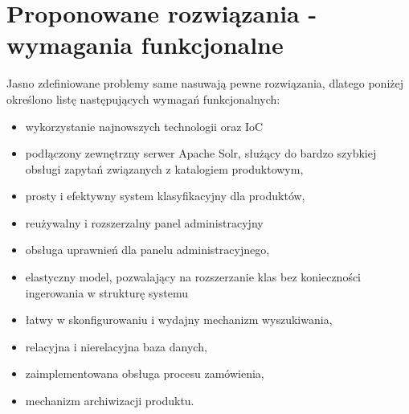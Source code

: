 \section{Proponowane rozwiązania - wymagania funkcjonalne}
Jasno zdefiniowane problemy same nasuwają pewne rozwiązania, dlatego poniżej określono listę następujących wymagań funkcjonalnych:
\begin{itemize}
	\item wykorzystanie najnowszych technologii oraz IoC
	\item podłączony zewnętrzny serwer Apache Solr, służący do bardzo szybkiej obsługi zapytań związanych z katalogiem produktowym,
	\item prosty i efektywny system klasyfikacyjny dla produktów,
	\item reużywalny i rozszerzalny panel administracyjny 
	\item obsługa uprawnień dla panelu administracyjnego,
	\item elastyczny model, pozwalający na rozszerzanie klas bez konieczności ingerowania w strukturę systemu
	\item łatwy w skonfigurowaniu i wydajny mechanizm wyszukiwania,
	\item relacyjna i nierelacyjna baza danych,
	\item zaimplementowana obsługa procesu zamówienia,
	\item mechanizm archiwizacji produktu.
\end{itemize} 

